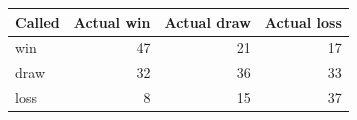 
\begin{tabular}{lrrr}
\toprule
Called & Actual win & Actual draw & Actual loss\\
\midrule
win & 47 & 21 & 17\\
draw & 32 & 36 & 33\\
loss & 8 & 15 & 37\\
\bottomrule
\end{tabular}
